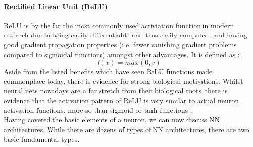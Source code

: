 \documentclass[12pt]{article}
\begin{document}
\paragraph{Rectified Linear Unit (ReLU)}
ReLU is by the far the most commonly used activiation function in modern research due to being easily differentiable and thus easily computed, and having good gradient propagation properties \autocite{pmlr-v15-glorot11a} (i.e. fewer vanishing gradient problems compared to sigmoidal functions) amongst other advantages. It is defined as \autocite{DBLP:conf/icml/NairH10}:
\begin{equation}
    f(x) = max(0,x)
\end{equation}
Aside from the listed benefits which have seen ReLU functions made commonplace today, there is evidence for strong biological motivations. Whilst neural nets nowadays are a far stretch from their biological roots, there is evidence that the activation pattern of ReLU is very similar to actual neuron activation functions, more so than sigmoid or tanh functions \autocite{pmlr-v15-glorot11a}.\\\newline
Having covered the basic elements of a neuron, we can now discuss NN architectures. While there are dozens of types of NN architectures, there are two basic fundamental types.
\end{document}
